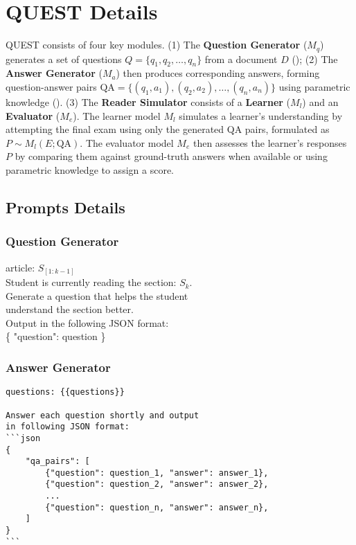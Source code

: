 \section{\textsc{QUEST} Details}
\label{appendix:quest-details}
\textsc{QUEST} consists of four key modules. 
(1) The \textbf{Question Generator} (\(M_q\)) generates a set of questions \( Q = \{q_1, q_2, \dots, q_n\} \) from a document \( D \) ();
(2) The \textbf{Answer Generator} (\(M_a\)) then produces corresponding answers, forming question-answer pairs \( \text{QA} = \{(q_1, a_1), (q_2, a_2), \dots, (q_n, a_n)\} \) using parametric knowledge ().
(3) The \textbf{Reader Simulator} consists of a \textbf{Learner} (\(M_l\)) and an \textbf{Evaluator} (\(M_e\)). The learner model \(M_l\) simulates a learner’s understanding by attempting the final exam using only the generated QA pairs, formulated as \( P \sim M_l(E; \text{QA}) \). 
The evaluator model \(M_e\) then assesses the learner’s responses \( P \) by comparing them against ground-truth answers when available or using parametric knowledge to assign a score.

\subsection{Prompts Details}
\label{appdx:prompt-details}
 
\subsubsection{Question Generator}
\label{appdx:question-generator}

\begin{tcolorbox}[
title=Question Generator, myboxstyle, breakable
]
article: {\(\mathit{S_{[1:k-1]}}\)}  \\
Student is currently reading the section: {\(\mathit{S_k}\)}.  \\

Generate a question that helps the student  \\
understand the section better.  \\

Output in the following JSON format: \\  
\{
    "question": question
\}
\end{tcolorbox}


\subsubsection{Answer Generator}
\begin{tcolorbox}[title=Answer Generator, myboxstyle, breakable]
\begin{verbatim}
questions: {{questions}}

Answer each question shortly and output
in following JSON format:
```json
{
    "qa_pairs": [
        {"question": question_1, "answer": answer_1},
        {"question": question_2, "answer": answer_2},
        ...
        {"question": question_n, "answer": answer_n},
    ]
}
```
\end{verbatim}
\end{tcolorbox}

